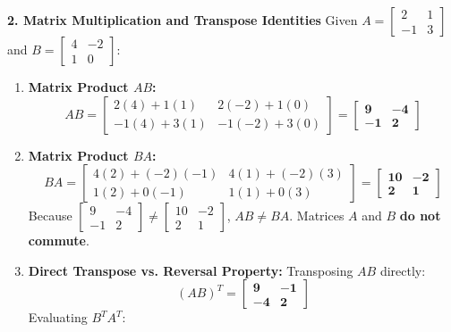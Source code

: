 \textbf{2. Matrix Multiplication and Transpose Identities}
Given $A = \begin{bmatrix} 2 & 1 \\ -1 & 3 \end{bmatrix}$ and $B = \begin{bmatrix} 4 & -2 \\ 1 & 0 \end{bmatrix}$:
\begin{enumerate}
    \item \textbf{Matrix Product $AB$:}
    \begin{equation*}
    AB = \begin{bmatrix} 2(4) + 1(1) & 2(-2) + 1(0) \\ -1(4) + 3(1) & -1(-2) + 3(0) \end{bmatrix} = \mathbf{\begin{bmatrix} 9 & -4 \\ -1 & 2 \end{bmatrix}}
    \end{equation*}
    \item \textbf{Matrix Product $BA$:}
    \begin{equation*}
    BA = \begin{bmatrix} 4(2) + (-2)(-1) & 4(1) + (-2)(3) \\ 1(2) + 0(-1) & 1(1) + 0(3) \end{bmatrix} = \mathbf{\begin{bmatrix} 10 & -2 \\ 2 & 1 \end{bmatrix}}
    \end{equation*}
    Because $\begin{bmatrix} 9 & -4 \\ -1 & 2 \end{bmatrix} \neq \begin{bmatrix} 10 & -2 \\ 2 & 1 \end{bmatrix}$, $AB \neq BA$. Matrices $A$ and $B$ \textbf{do not commute}.
    \item \textbf{Direct Transpose vs. Reversal Property:}
    Transposing $AB$ directly:
    \begin{equation*}
    (AB)^T = \mathbf{\begin{bmatrix} 9 & -1 \\ -4 & 2 \end{bmatrix}}
    \end{equation*}
    Evaluating $B^T A^T$:
    \begin{equation*}

\end{equation*}
\end{enumerate}
